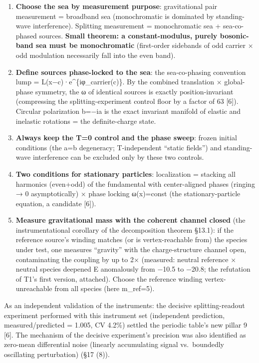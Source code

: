 \documentclass[
]{article}
\providecommand{\tightlist}{%
  \setlength{\itemsep}{0pt}\setlength{\parskip}{0pt}}
\begin{document}
\begin{enumerate}
\def\labelenumi{\arabic{enumi}.}
\tightlist
\item
  \textbf{Choose the sea by measurement purpose}: gravitational pair
  measurement = broadband sea (monochromatic is dominated by
  standing-wave interference). Splitting measurement = monochromatic sea
  + sea-co-phased sources. \textbf{Small theorem: a constant-modulus,
  purely bosonic-band sea must be monochromatic} (first-order sidebands
  of odd carrier × odd modulation necessarily fall into the even band).
\item
  \textbf{Define sources phase-locked to the sea}: the sea-co-phasing
  convention lump = L(x−c)·e\^{}\{iφ\_carrier(c)\}. By the combined
  translation × global-phase symmetry, the ω of identical sources is
  exactly position-invariant (compressing the splitting-experiment
  control floor by a factor of 63 {[}6{]}). Circular polarization b=−ia
  is the exact invariant manifold of elastic and inelastic rotations =
  the definite-charge state.
\item
  \textbf{Always keep the T=0 control and the phase sweep}: frozen
  initial conditions (the a=b degeneracy; T-independent ``static
  fields'') and standing-wave interference can be excluded only by these
  two controls.
\item
  \textbf{Two conditions for stationary particles}: localization =
  stacking all harmonics (even+odd) of the fundamental with
  center-aligned phases (ringing → 0 asymptotically) × phase locking
  ω(x)=const (the stationary-particle equation, a candidate {[}6{]}).
\item
  \textbf{Measure gravitational mass with the coherent channel closed}
  (the instrumentational corollary of the decomposition theorem §13.1):
  if the reference source's winding matches (or is vertex-reachable
  from) the species under test, one measures ``gravity'' with the
  charge-structure channel open, contaminating the coupling by up to 2×
  (measured: neutral reference × neutral species deepened E anomalously
  from −10.5 to −20.8; the refutation of T1's first version, attached).
  Choose the reference winding vertex-unreachable from all species (here
  m\_ref=5).
\end{enumerate}

As an independent validation of the instruments: the decisive
splitting-readout experiment performed with this instrument set
(independent prediction, measured/predicted = 1.005, CV 4.2\%) settled
the periodic table's new pillar 9 {[}6{]}. The mechanism of the decisive
experiment's precision was also identified as zero-mean differential
noise (linearly accumulating signal vs.~boundedly oscillating
perturbation) (§17 (8)).
\end{document}
